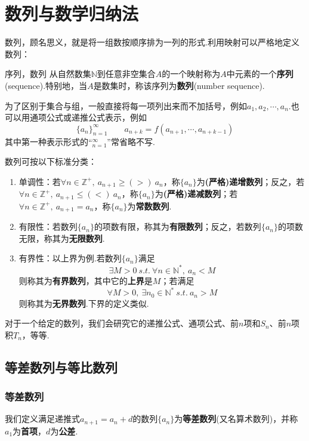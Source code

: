 \documentclass[lang=cn, zihao=5]{elegantbook}
\begin{document}
\chapter{数列与数学归纳法}

数列，顾名思义，就是将一组数按顺序排为一列的形式.利用映射可以严格地定义数列：

\begin{definition}{序列，数列}
	从自然数集$\mathbb{N}$到任意非空集合$A$的一个映射称为$A$中元素的一个\textbf{序列}(sequence).特别地，当$A$是数集时，称该序列为\textbf{数列}(number sequence).
\end{definition}

为了区别于集合与组，一般直接将每一项列出来而不加括号，例如$a_1,a_2, \cdots ,a_n$.也可以用通项公式或递推公式表示，例如
$$\{ a_n \}_{n=1}^{\infty} \qquad a_{n+k}=f(a_{n+1}, \cdots ,a_{n+k-1})$$
其中第一种表示形式的“$_{n=1}^{\infty}$”常省略不写.

数列可按以下标准分类：
\begin{enumerate}
	\item 单调性：若$\forall n \in \mathbb{Z}^+,~ a_{n+1} \geq (>)~ a_n$，称$\{ a_n \}$为\textbf{(严格)递增数列}；反之，若$\forall n \in \mathbb{Z}^+,~ a_{n+1} \leq (<)~ a_n$，称$\{ a_n \}$为\textbf{(严格)递减数列}；若$\forall n \in \mathbb{Z}^+,~ a_{n+1} = a_n$，称$\{ a_n \}$为\textbf{常数数列}.
	\item 有限性：若数列$\{ a_n \}$的项数有限，称其为\textbf{有限数列}；反之，若数列$\{ a_n \}$的项数无限，称其为\textbf{无限数列}.
	\item 有界性：以上界为例.若数列$\{ a_n \}$满足
	$$\exists M > 0 ~s.t.~ \forall n \in \mathbb{N}^{*},~ a_n<M$$
	则称其为\textbf{有界数列}，其中它的\textbf{上界}是$M$；若满足
	$$\forall M > 0 ,~ \exists n_0 \in \mathbb{N}^{*} ~s.t.~ a_n>M$$
	则称其为\textbf{无界数列}.下界的定义类似.
\end{enumerate}

对于一个给定的数列，我们会研究它的递推公式、通项公式、前$n$项和$S_n$、前$n$项积$T_n$，等等.

\section{等差数列与等比数列}

\subsection{等差数列}

我们定义满足递推式$a_{n+1}=a_n+d$的数列$\{ a_n \}$为\textbf{等差数列}(又名算术数列)，并称$a_1$为\textbf{首项}，$d$为\textbf{公差}.
\end{document}
